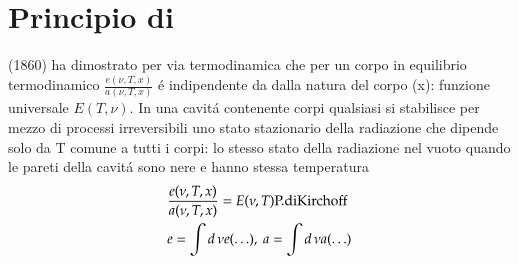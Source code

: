 \documentclass[main.tex]{subfiles}
\begin{document}
\section{Principio di \khhff{}}
\khhff{}(1860) ha dimostrato per via termodinamica che per un corpo in equilibrio termodinamico $\frac{e(\nu,T,x)}{a(\nu,T,x)}$ \'e indipendente da dalla natura del corpo (x): funzione universale $E(T,\nu)$. In una cavit\'a contenente corpi qualsiasi si stabilisce per mezzo di processi irreversibili uno stato stazionario della radiazione che dipende solo da T comune a tutti i corpi: lo stesso stato della radiazione nel vuoto quando le pareti della cavit\'a sono nere e hanno stessa temperatura
\begin{align}
    &\frac{e(\nu,T,x)}{a(\nu,T,x)}=E(\nu,T)\text{P.diKirchoff{}}\label{eq:pkhhff}\\
    &e=\int d\,\nu e(\ldots),\ a=\int d\,\nu a(\ldots)
\end{align}
\end{document}
